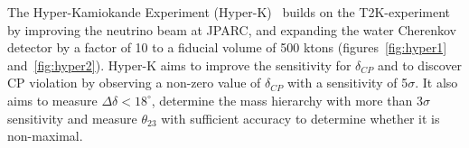 The Hyper-Kamiokande Experiment (Hyper-K)~\cite{24HyperK}  builds on the T2K-experiment~\cite{21T2K} by improving the neutrino beam at JPARC, and expanding the water Cherenkov detector by a factor of 10 to a fiducial volume of 500 ktons (figures~\ref{fig:hyper1} and~\ref{fig:hyper2}). Hyper-K aims to improve the sensitivity for $\delta_{CP}$ and to discover CP violation by observing a non-zero value of $\delta_{CP}$ with a sensitivity of 5$\sigma$. It also aims to measure $\Delta \delta < 18^\circ$, determine the mass hierarchy with more than 3$\sigma$ sensitivity and measure $\theta_{23}$ with sufficient accuracy to determine whether it is non-maximal.


